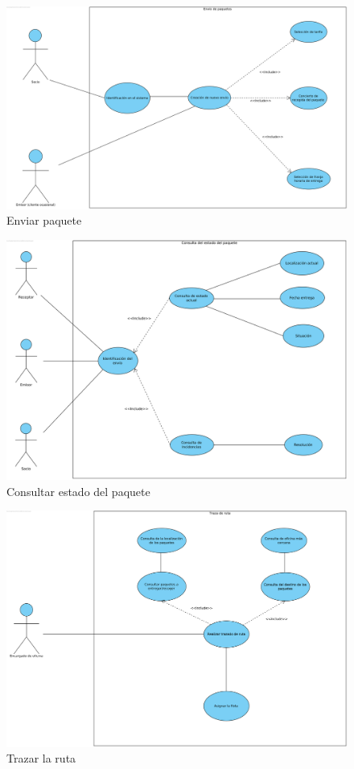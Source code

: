 \documentclass[12pt,spanish]{article}
\begin{document}
\begin{figure}[H]
\centering
\includegraphics[scale=0.5]{enviar_paquete.png}
\caption{Enviar paquete}
\end{figure}

\begin{figure}[H]
\centering
\includegraphics[scale=0.5]{consultar_estado.png}
\caption{Consultar estado del paquete}
\end{figure}

\begin{figure}[H]
\centering
\includegraphics[scale=0.5]{trazar_ruta.png}
\caption{Trazar la ruta}
\end{figure}
\end{document}
